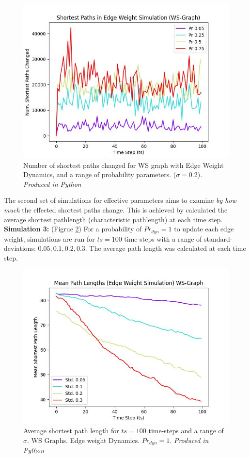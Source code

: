 \documentclass[
	a4paper, %
	10pt, %
	unnumberedsections, %
	twoside, %
]{LTJournalArticle}
\begin{document}
\begin{figure}[H]
	\includegraphics[width=\linewidth]{Figures/ewd/ew1_paths_prob.jpg}
	\caption{Number of shortest paths changed for WS graph with Edge Weight Dynamics, and a range of probability parameters. (\(\sigma = 0.2\)). \emph{Produced in Python}}
	\label{fig:ewd_ex2}
\end{figure}

The second set of simulations for effective parameters aims to examine \emph{by how much} the effected shortest paths change. This is achieved by calculated the average shortest pathlength (characteristic pathlength) at each time step. \\

\textbf{Simulation 3:} (Figrue \ref{fig:ewd_ex3}) For a probability of \(Pr_{dyn} = 1\) to update each edge weight, simulations are run for \(ts = 100\) time-steps with a range of standard-deviations: \(0.05, 0.1, 0.2, 0.3\). The average path length was calculated at each time step. \\

\begin{figure}[H]
	\includegraphics[width=\linewidth]{Figures/ewd/ew1_length_std.jpg}
	\caption{Average shortest path length for \(ts = 100\) time-steps and a range of \(\sigma\). WS Graphs. Edge weight Dynamics. \(Pr_{dyn} = 1\). \emph{Produced in Python}}
	\label{fig:ewd_ex3}
\end{figure}
\end{document}
